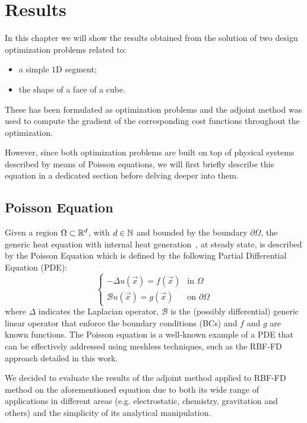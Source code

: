 \chapter{Results}

In this chapter we will show the results obtained from the solution of two design optimization problems related to:
\begin{itemize}
	\item a simple $1$D segment;
	\item the shape of a face of a cube.
\end{itemize}
These has been formulated as optimization problems and the adjoint method was used to compute the gradient of the corresponding cost functions throughout the optimization.

However, since both optimization problems are built on top of physical systems described by means of Poisson equations, we will first briefly describe this equation in a dedicated section before delving deeper into them.

\section{Poisson Equation}
\label{sec:poisson_equation}

Given a region $\Omega \subset \mathbb{R}^d$, with $d \in \mathbb{N}$ and bounded by the boundary $\partial\Omega$, the generic heat equation with internal heat generation~\cite{Brezis:functional_analysis_book}, at steady state, is described by the Poisson Equation which is defined by the following Partial Differential Equation (PDE):
\begin{equation}
	\label{eqn:Poisson_equation}
	\begin{cases}
		- \Delta u(\vec{x}) = f(\vec{x})														 &  \text{in $\Omega$}							\\
		\mathcal{B} u(\vec{x}) = g(\vec{x})  													 &  \text{on $\partial\Omega$}
	\end{cases}
\end{equation}
where $\Delta$ indicates the Laplacian operator, $\mathcal{B}$ is the (possibly differential) generic linear operator that enforce the boundary conditions (BCs) and $f$ and $g$ are known functions.
The Poisson equation is a well-known example of a PDE that can be effectively addressed using meshless techniques, such as the RBF-FD approach detailed in this work.

We decided to evaluate the results of the adjoint method applied to RBF-FD method on the aforementioned equation due to both its wide range of applications in different areas	(e.g. electrostatic, chemistry, gravitation and others) and the simplicity of its analytical manipulation.

